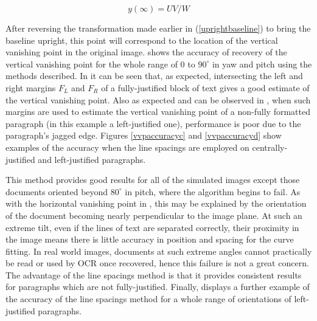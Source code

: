\begin{equation}
y(\infty) = UV/W
\end{equation}
 
After reversing the transformation made earlier in (\ref{uprightbaseline}) to
bring the baseline upright, this point will correspond to the location of the
vertical vanishing point in the original image.
 shows the accuracy of recovery of the vertical vanishing
point for the whole range of $0$ to $90^\circ$ in yaw and pitch using the
methods described.  In  it can be seen that, as expected,
intersecting the left and right margins $F_L$ and $F_R$ of a fully-justified block of text gives a
good estimate of the vertical vanishing point.  Also as expected and can be
observed in , when such margins are used to estimate the
vertical vanishing point of a non-fully formatted paragraph (in this example a
left-justified one), performance is poor due to the paragraph's jagged edge.
Figures \ref{vvpaccuracyc} and \ref{vvpaccuracyd} show  examples of the accuracy when the line
spacings are employed on centrally-justified and left-justified  paragraphs.

This method provides good
results  for all of the simulated images except those
documents oriented beyond $80^\circ$ in pitch, where the algorithm begins to
fail. 
As with the horizontal vanishing point in , this may be
explained by the orientation of the document becoming nearly perpendicular to
the image plane. At such an extreme tilt, even if the lines of text are
separated correctly, their proximity in the image means there is little accuracy
in position and spacing for the curve fitting. In real world images, documents
at such extreme angles cannot practically be read or used by OCR once recovered,
hence this failure is not a great concern. The advantage of the line spacings
method is that it provides consistent results for paragraphs which are not 
fully-justified. Finally,  displays a further example of the
accuracy of the line spacings method for a whole range of orientations of
left-justified paragraphs.

